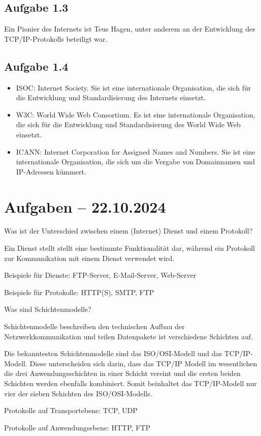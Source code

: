 \documentclass[11pt]{article}
\begin{document}
\subsection{Aufgabe 1.3}
Ein Pionier des Internets ist Teus Hagen, unter anderem an der Entwicklung des TCP/IP-Protokolls beteiligt
war.

\subsection{Aufgabe 1.4}
\begin{itemize}
  \item ISOC: Internet Society. Sie ist eine internationale Organisation, die sich für die Entwicklung und
        Standardisierung des Internets einsetzt.
  \item W3C: World Wide Web Consortium. Es ist eine internationale Organisation, die sich für die Entwicklung und 
  Standardisierung des World Wide Web einsetzt.
  \item ICANN: Internet Corporation for Assigned Names and Numbers. Sie ist eine internationale Organisation, die sich 
  um die Vergabe von Domainnamen und IP-Adressen kümmert.
\end{itemize}

\section{Aufgaben -- 22.10.2024}
\begin{aufgabe}
  Was ist der Unterschied zwischen einem (Internet) Dienst und einem Protokoll?

  Ein Dienst stellt stellt eine bestimmte Funktionalität dar, während ein Protokoll zur Kommunikation mit einem Dienst
  verwendet wird.

  Beispiele für Dienste: FTP-Server, E-Mail-Server, Web-Server

  Beispiele für Protokolle: HTTP(S), SMTP, FTP
\end{aufgabe}

\begin{aufgabe}
  Was sind Schichtenmodelle?

  Schichtenmodelle beschreiben den technischen Aufbau der Netzwerkkommunikation und teilen Datenpakete ist verschiedene
  Schichten auf.

  Die bekanntesten Schichtenmodelle sind das ISO/OSI-Modell und das TCP/IP-Modell. Diese unterscheiden sich darin, dass
  das TCP/IP Modell im wesentlichen die drei Anwendungsschichten in einer Schicht vereint und die ersten beiden Schichten
  werden ebenfalls kombiniert. Somit beinhaltet das TCP/IP-Modell nur vier der sieben Schichten des ISO/OSI-Modells.

  Protokolle auf Transportebene: TCP, UDP

  Protokolle auf Anwendungsebene: HTTP, FTP
\end{aufgabe}
\end{document}
